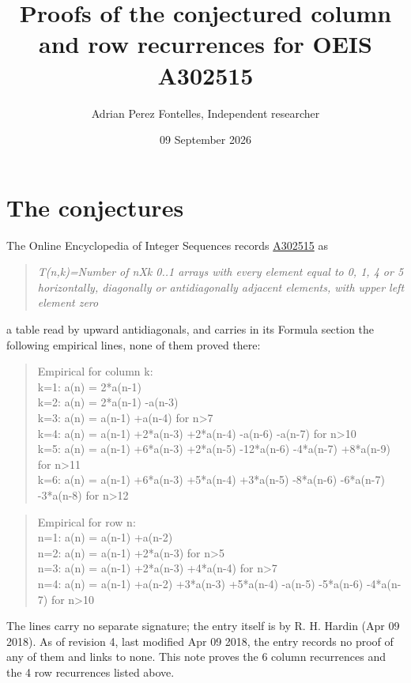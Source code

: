 \documentclass[11pt]{article}
\title{Proofs of the conjectured column and row recurrences for OEIS A302515}
\author{Adrian Perez Fontelles, Independent researcher}
\date{09 September 2026}
\theoremstyle{definition}
\begin{document}
\maketitle
\section{The conjectures}

The Online Encyclopedia of Integer Sequences records \href{https://oeis.org/A302515}{A302515} as

\begin{quote}\itshape T(n,k)=Number of nXk 0..1 arrays with every element equal to 0, 1, 4 or 5 horizontally, diagonally or antidiagonally adjacent elements, with upper left element zero\end{quote}

a table read by upward antidiagonals, and carries in its Formula section the following empirical lines, none of them proved there:

\begin{quote}\ttfamily Empirical for column k:\\
k=1: a(n) = 2*a(n-1)\\k=2: a(n) = 2*a(n-1) -a(n-3)\\k=3: a(n) = a(n-1) +a(n-4) for n>7\\k=4: a(n) = a(n-1) +2*a(n-3) +2*a(n-4) -a(n-6) -a(n-7) for n>10\\k=5: a(n) = a(n-1) +6*a(n-3) +2*a(n-5) -12*a(n-6) -4*a(n-7) +8*a(n-9) for n>11\\k=6: a(n) = a(n-1) +6*a(n-3) +5*a(n-4) +3*a(n-5) -8*a(n-6) -6*a(n-7) -3*a(n-8) for n>12\end{quote}

\begin{quote}\ttfamily Empirical for row n:\\
n=1: a(n) = a(n-1) +a(n-2)\\n=2: a(n) = a(n-1) +2*a(n-3) for n>5\\n=3: a(n) = a(n-1) +2*a(n-3) +4*a(n-4) for n>7\\n=4: a(n) = a(n-1) +a(n-2) +3*a(n-3) +5*a(n-4) -a(n-5) -5*a(n-6) -4*a(n-7) for n>10\end{quote}

The lines carry no separate signature; the entry itself is by R. H. Hardin (Apr 09 2018). As of revision 4, last modified Apr 09 2018, the entry records no proof of any of them and links to none. This note proves the 6 column recurrences and the 4 row recurrences listed above.
\end{document}
